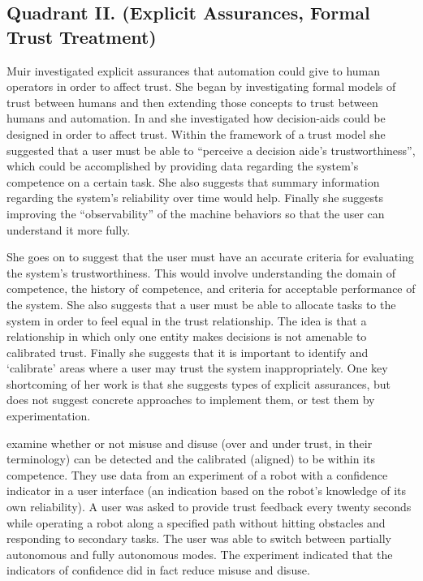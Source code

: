 \subsection{Quadrant II. (Explicit Assurances, Formal Trust Treatment)}\label{sec:q2}
Muir investigated explicit assurances that automation could give to human operators in order to affect trust. She began by investigating formal models of trust between humans and then extending those concepts to trust between humans and automation. In \cite{Muir1987-mk} and \cite{Muir1994-ow} she investigated how decision-aids could be designed in order to affect trust. Within the framework of a trust model she suggested that a user must be able to ``perceive a decision aide's trustworthiness'', which could be accomplished by providing data regarding the system's competence on a certain task. She also suggests that summary information regarding the system's reliability over time would help. Finally she suggests improving the ``observability'' of the machine behaviors so that the user can understand it more fully.

She goes on to suggest that the user must have an accurate criteria for evaluating the system's trustworthiness. This would involve understanding the domain of competence, the history of competence, and criteria for acceptable performance of the system. She also suggests that a user must be able to allocate tasks to the system in order to feel equal in the trust relationship. The idea is that a relationship in which only one entity makes decisions is not amenable to calibrated trust. Finally she suggests that it is important to identify and `calibrate' areas where a user may trust the system inappropriately. One key shortcoming of her work is that she suggests types of explicit assurances, but does not suggest concrete approaches to implement them, or test them by experimentation.

\citet{Kaniarasu2013-ho} examine whether or not misuse and disuse (over and under trust, in their terminology) can be detected and the calibrated (aligned) to be within its competence. They use data from an experiment of a robot with a confidence indicator in a user interface (an indication based on the robot's knowledge of its own reliability). A user was asked to provide trust feedback every twenty seconds while operating a robot along a specified path without hitting obstacles and responding to secondary tasks. The user was able to switch between partially autonomous and fully autonomous modes. The experiment indicated that the indicators of confidence did in fact reduce misuse and disuse.  

